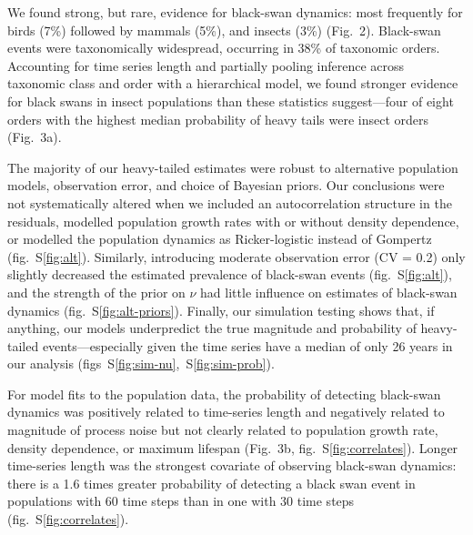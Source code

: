We found strong, but rare, evidence for black-swan dynamics: most frequently for birds (7\%) followed by mammals (5\%), and insects (3\%) (Fig.~2). Black-swan events were taxonomically widespread, occurring in 38\% of taxonomic orders. Accounting for time series length and partially pooling inference across taxonomic class and order with a hierarchical model, we found stronger evidence for black swans in insect populations than these statistics suggest---four of eight orders with the highest median probability of heavy tails were insect orders (Fig.~3a).

The majority of our heavy-tailed estimates were robust to alternative population models, observation error, and choice of Bayesian priors. Our conclusions were not systematically altered when we included an autocorrelation structure in the residuals, modelled population growth rates with or without density dependence, or modelled the population dynamics as Ricker-logistic instead of Gompertz (fig.~S\ref{fig:alt}). Similarly, introducing moderate observation error (CV = 0.2) only slightly decreased the estimated prevalence of black-swan events (fig.~S\ref{fig:alt}), and the strength of the prior on \(\nu\) had little influence on estimates of black-swan dynamics (fig.~S\ref{fig:alt-priors}). Finally, our simulation testing shows that, if anything, our models underpredict the true magnitude and probability of heavy-tailed events---especially given the time series have a median of only 26 years in our analysis (figs~S\ref{fig:sim-nu},~S\ref{fig:sim-prob}).

For model fits to the population data, the probability of detecting black-swan dynamics was positively related to time-series length and negatively related to magnitude of process noise but not clearly related to population growth rate, density dependence, or maximum lifespan (Fig.~3b, fig.~S\ref{fig:correlates}). Longer time-series length was the strongest covariate of observing black-swan dynamics: there is a 1.6 times greater probability of detecting a black swan event in populations with 60 time steps than in one with 30 time steps (fig.~S\ref{fig:correlates}).

